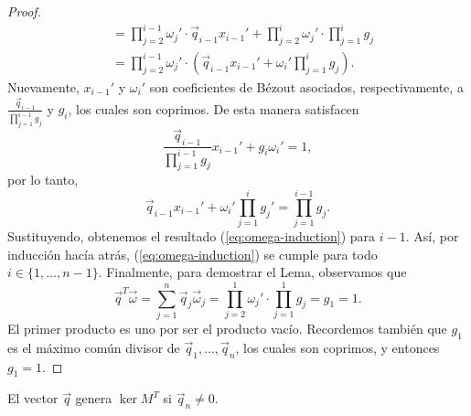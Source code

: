 \begin{proof}
\begin{align*}
		&= \prod_{j=2}^{i-1}\omega_j' \cdot \vec{q}_{i-1}x_{i-1}' + \prod_{j=2}^{i}\omega_j' \cdot
		\prod_{j=1}^{i}g_j \\
		&= \prod_{j=2}^{i-1}\omega_j' \cdot \left( \vec{q}_{i-1}x_{i-1}' + \omega_i'
			\prod_{j=1}^{i}g_j \right).
	\end{align*}
	Nuevamente, $x_{i-1}'$ y $\omega_i'$ son coeficientes de Bézout asociados, respectivamente, a
	$\frac{\vec{q}_{i-1}}{\prod_{j=1}^{i-1}g_j}$ y $g_i$, los cuales son coprimos. De esta manera
	satisfacen
	\begin{equation*}
		\frac{\vec{q}_{i-1}}{\prod_{j=1}^{i-1}g_j}x_{i-1}' +
		g_i \omega_i' = 1,
	\end{equation*}
	por lo tanto,
	\begin{equation*}
		\vec{q}_{i-1}x_{i-1}' + \omega_i'\prod_{j=1}^{i}g_j' = \prod_{j=1}^{i-1}g_j.
	\end{equation*}
	Sustituyendo, obtenemos el resultado (\ref{eq:omega-induction}) para $i - 1$. Así, por inducción
	hacía atrás, (\ref{eq:omega-induction}) se cumple para todo $i \in \lbrace 1, \ldots, n - 1
	\rbrace$. Finalmente, para demostrar el Lema, observamos que
	\begin{equation*}
		\vec{q}^T\vec{\omega} = \sum_{j=1}^{n}\vec{q}_j\vec{\omega}_j = \prod_{j=2}^{1}\omega_j'
		\cdot \prod_{j=1}^{1}g_j = g_1 = 1.
	\end{equation*}
	El primer producto es uno por ser el producto vacío. Recordemos también que $g_1$ es el máximo
	común divisor de $\vec{q}_1, \ldots, \vec{q}_n$, los cuales son coprimos, y entonces $g_1 = 1$.
\end{proof}
\begin{lemma}
	\label{lemma:iso2}
	El vector $\vec{q}$ genera $\ker{M^T}$ si $\vec{q}_n \neq 0$.
\end{lemma}
